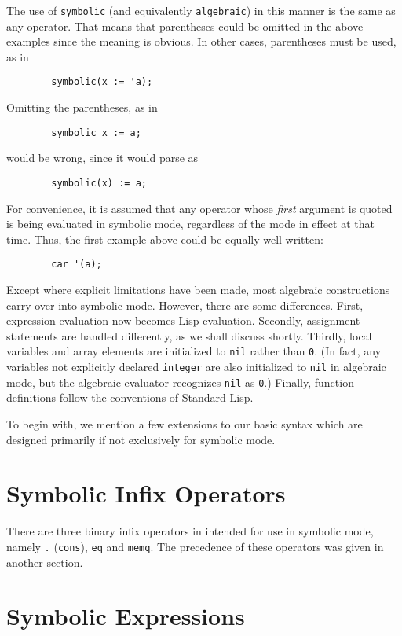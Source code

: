 The use of \texttt{symbolic} (and equivalently \texttt{algebraic}) in this
manner is the same as any operator.  That means that parentheses could be
omitted in the above examples since the meaning is obvious.  In other
cases, parentheses must be used, as in

\begin{verbatim}
        symbolic(x := 'a);
\end{verbatim}
Omitting the parentheses, as in
\begin{verbatim}
        symbolic x := a;
\end{verbatim}
would be wrong, since it would parse as
\begin{verbatim}
        symbolic(x) := a;
\end{verbatim}
For convenience, it is assumed that any operator whose \emph{first} argument is
quoted is being evaluated in symbolic mode, regardless of the mode in
effect at that time. Thus, the first example above could be equally well
written:
\begin{verbatim}
        car '(a);
\end{verbatim}
Except where explicit limitations have been made, most {\REDUCE} algebraic
constructions carry over into symbolic mode.
However, there are some differences.  First, expression evaluation now
becomes Lisp evaluation.  Secondly, assignment statements are handled
differently, as we shall discuss shortly.  Thirdly, local variables and array
elements are initialized to \texttt{nil} rather than \texttt{0}. (In fact, any
variables not explicitly declared \texttt{integer} are also initialized to
\texttt{nil} in algebraic mode, but the algebraic evaluator recognizes 
\texttt{nil} as \texttt{0}.) Finally, function definitions follow the 
conventions of
Standard Lisp.

To begin with, we mention a few extensions to our basic syntax which are
designed primarily if not exclusively for symbolic mode.

\section{Symbolic Infix Operators}

There are three binary infix operators in {\REDUCE} intended for use in
symbolic mode, namely \texttt{.} (\texttt{cons}), \texttt{eq} and 
\texttt{memq}. The precedence of these operators was given in another section.

\section{Symbolic Expressions}

